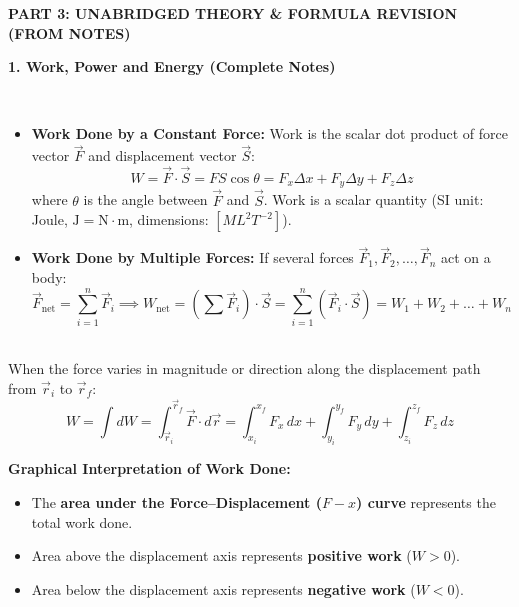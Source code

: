 \documentclass[11pt,a4paper]{article}
\begin{document}
\vspace{5pt}


\begin{tcolorbox}[sectionbanner]
  {\large \textbf{\textsf{PART 3: UNABRIDGED THEORY \& FORMULA REVISION (FROM NOTES)}}}
\end{tcolorbox}
\vspace{4pt}

\begin{tcolorbox}[chapterbanner]
  {\Large \textbf{\textsf{1. Work, Power and Energy (Complete Notes)}}}
\end{tcolorbox}
\vspace{4pt}

\noindent{\large\textbf{\textsf{\textcolor{primaryDark}{1.1 Work Done by Constant and Multiple Forces}}}}\\[3pt]
\begin{itemize}[leftmargin=14pt,itemsep=2pt]
  \item \textbf{Work Done by a Constant Force:} Work is the scalar dot product of force vector $\vec{F}$ and displacement vector $\vec{S}$:
  \[
    W = \vec{F} \cdot \vec{S} = F S \cos\theta = F_x \Delta x + F_y \Delta y + F_z \Delta z
  \]
  where $\theta$ is the angle between $\vec{F}$ and $\vec{S}$. Work is a scalar quantity (SI unit: Joule, $\text{J} = \text{N}\cdot\text{m}$, dimensions: $[M L^2 T^{-2}]$).
  \item \textbf{Work Done by Multiple Forces:} If several forces $\vec{F}_1, \vec{F}_2, \dots, \vec{F}_n$ act on a body:
  \[
    \vec{F}_{\text{net}} = \sum_{i=1}^n \vec{F}_i \implies W_{\text{net}} = \left(\sum \vec{F}_i\right) \cdot \vec{S} = \sum_{i=1}^n (\vec{F}_i \cdot \vec{S}) = W_1 + W_2 + \dots + W_n
  \]
\end{itemize}

\vspace{5pt}
\noindent{\large\textbf{\textsf{\textcolor{primaryDark}{1.2 Work Done by a Variable Force \& Graphical Meaning}}}}\\[3pt]
When the force varies in magnitude or direction along the displacement path from $\vec{r}_i$ to $\vec{r}_f$:
\[
  W = \int dW = \int_{\vec{r}_i}^{\vec{r}_f} \vec{F} \cdot d\vec{r} = \int_{x_i}^{x_f} F_x\,dx + \int_{y_i}^{y_f} F_y\,dy + \int_{z_i}^{z_f} F_z\,dz
\]
\begin{tcolorbox}[formulacard]
  \textbf{\textcolor{l3Crimson}{Graphical Interpretation of Work Done:}}
  \begin{itemize}[leftmargin=12pt,itemsep=1.5pt]
    \item The \textbf{area under the Force--Displacement ($F-x$) curve} represents the total work done.
    \item Area above the displacement axis represents \textbf{positive work} ($W > 0$).
    \item Area below the displacement axis represents \textbf{negative work} ($W < 0$).
  \end{itemize}
\end{tcolorbox}
\end{document}
